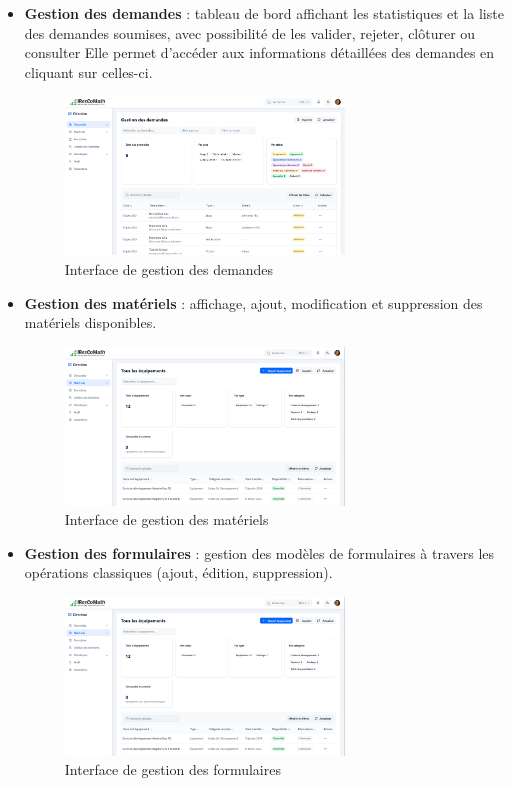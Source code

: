 \begin{itemize}
    \item \textbf{Gestion des demandes} : tableau de bord affichant les statistiques et la liste des demandes soumises, avec possibilité de les valider, rejeter, clôturer ou consulter Elle permet d'accéder aux informations détaillées des demandes en cliquant sur celles-ci.
    \begin{figure}[H]
        \centering
        \includegraphics[width=0.7\textwidth]{images/interface/Demandes.png}
        \caption{Interface de gestion des demandes}
        \label{fig:gestion_demandes_directeur}
    \end{figure}

    \item \textbf{Gestion des matériels} : affichage, ajout, modification et suppression des matériels disponibles.
    \begin{figure}[H]
        \centering
        \includegraphics[width=0.7\textwidth]{images/interface/materiels.png}
        \caption{Interface de gestion des matériels}
        \label{fig:gestion_materiels_directeur}
    \end{figure}

    \item \textbf{Gestion des formulaires} : gestion des modèles de formulaires à travers les opérations classiques (ajout, édition, suppression).
    \begin{figure}[H]
        \centering
        \includegraphics[width=0.7\textwidth]{images/interface/Formulaires.png}
        \caption{Interface de gestion des formulaires}
        \label{fig:gestion_formulaires_directeur}
    \end{figure}


\end{itemize}
